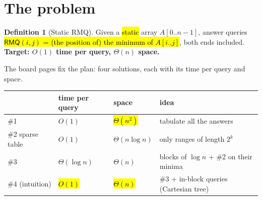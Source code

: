 \documentclass[11pt,a4paper]{article}
\theoremstyle{definition}\newtheorem*{definition}{Definition}
\newcommand{\hlg}[1]{{\sethlcolor{hlG}\hl{#1}}}
\newcommand{\hlp}[1]{{\sethlcolor{hlP}\hl{#1}}}
\newcommand{\hlb}[1]{{\sethlcolor{hlB}\hl{#1}}}
\begin{document}
\tableofcontents

\section{The problem}
\begin{definition}[Static RMQ]
Given a \hlb{static} array $A[0..n-1]$, answer queries \hlb{$\textsf{RMQ}(i,j)$ = (the position of) the minimum of $A[i..j]$}, both ends included. \textbf{Target: $O(1)$ time per query, $\Theta(n)$ space.}
\end{definition}
\noindent The board pages fix the plan: four solutions, each with its time per query and space.
\begin{center}
\begin{tabular}{llll}\toprule
 & time per query & space & idea \\\midrule
\#1 & $O(1)$ & \hlp{$\Theta(n^2)$} & tabulate all the answers \\
\#2 sparse table & $O(1)$ & $\Theta(n\log n)$ & only ranges of length $2^k$ \\
\#3 & $\Theta(\log n)$ & $\Theta(n)$ & blocks of $\log n$ + \#2 on their minima \\
\#4 (intuition) & \hlg{$O(1)$} & \hlg{$\Theta(n)$} & \#3 + in-block queries (Cartesian tree) \\\bottomrule
\end{tabular}
\end{center}

\end{document}
